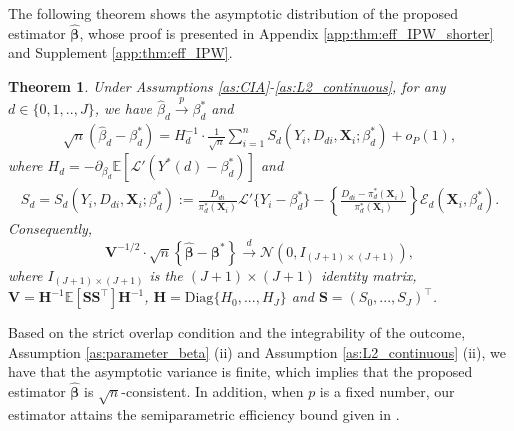 \documentclass[11pt]{article}
\newtheorem{theorem}[thm]{Theorem}
\numberwithin{equation}{section}
\begin{document}
The following theorem shows the asymptotic distribution of the proposed estimator $\widehat{\boldsymbol{\beta}}$, whose proof is presented in Appendix \ref{app:thm:eff_IPW_shorter} and Supplement \ref{app:thm:eff_IPW}.
\begin{theorem}\label{thm:eff_IPW}
	Under Assumptions \ref{as:CIA}-\ref{as:L2_continuous}, for any $d\in\{0,1,..,J\}$, we have $\widehat{\beta}_d\xrightarrow{p}\beta_d^*$ and
	\begin{align}\label{eq:betahat-beta*}
		\sqrt{n}(\widehat{\beta}_d-\beta^*_d)=H_d^{-1}\cdot\frac{1}{\sqrt{n}}\sum_{i=1}^nS_d (Y_i,D_{di},\boldsymbol{X}_{i};\beta_d^*)+o_P(1),
	\end{align}
	where  $H_d=-\partial_{\beta_d}\mathbb{E}[\mathcal{L}'(Y^*(d)-\beta_d^*)]$ and
	\begin{align*}
		S_d=S_d (Y_i,D_{di},\boldsymbol{X}_{i};\beta_d^*):=	\frac{D_{di}}{\pi_d^*(\boldsymbol{X}_{i})}\mathcal{L}'\{Y_i-\beta_d^*\}-\left\{\frac{D_{di}-\pi_d^*(\boldsymbol{X}_{i})}{\pi_d^*(\boldsymbol{X}_{i})}\right\}\mathcal{E}_d(\boldsymbol{X}_{i},\beta_d^*).
	\end{align*}
	Consequently,  $$\boldsymbol{V}^{-1/2}\cdot \sqrt{n}\left\{\widehat{\boldsymbol{\beta}}-\boldsymbol{\beta}^*\right\}\xrightarrow{d}\mathcal{N}\left(0,I_{(J+1)\times (J+1)}\right),$$ where $I_{(J+1)\times (J+1)}$ is the $(J+1)\times(J+1)$  identity matrix, $\boldsymbol{V}=\boldsymbol{H}^{-1} \mathbb{E}[\boldsymbol{S} \boldsymbol{S}^\top ]\boldsymbol{H}^{-1}$,  $\boldsymbol{H}=\text{Diag}\{H_0,...,H_J\}$ and $\boldsymbol{S}=(S_{0},...,S_J)^\top$.
\end{theorem}
Based on the strict overlap condition and the integrability of the outcome, Assumption \ref{as:parameter_beta} (ii) and Assumption \ref{as:L2_continuous} (ii), we have that  the asymptotic variance is finite, which implies that the proposed estimator $\widehat{\boldsymbol{\beta}}$ is {\color{black}$\sqrt{n}$-consistent.} In addition, when $p$ is a fixed number, our estimator attains the semiparametric efficiency bound given in \cite{ai2018unified}.

\end{document}
